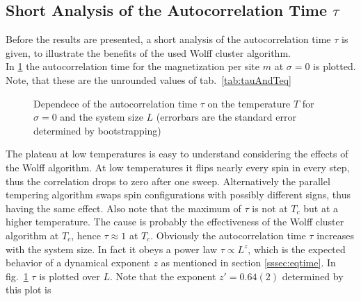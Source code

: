 \subsection{Short Analysis of the Autocorrelation Time  $\tau$}
\label{ssec:results:autocorr}
    Before the results are presented, a short analysis of the
    autocorrelation time \(\tau\) is given, to illustrate the benefits
    of the used Wolff cluster algorithm.\\
    In \ref{fig:autocorr}
    the autocorrelation time for the magnetization per site \(m\) at
    \(\sigma=0\) is plotted. Note, that these are the unrounded values
    of tab.\ \ref{tab:tauAndTeq}
    \begin{figure}[htbp]
        \centering
        \caption[The Autocorrelation Time $\tau$]
        {
            Dependece of the autocorrelation time $\tau$ on
             the temperature $T$ for
                $\sigma=0$ and
             the system size $L$ (errorbars
                are the standard error determined by bootstrapping)
        }
        \label{fig:autocorr}
    \end{figure}
    The plateau at low temperatures is easy to understand considering the
    effects of the Wolff algorithm. At low temperatures it flips nearly every
    spin in every step, thus the correlation drops to zero after one sweep.
    Alternatively the parallel tempering algorithm swaps spin configurations
    with possibly different signs, thus having the same effect.
    Also note that the maximum of \(\tau\) is not at \(T_c\) but at a higher
    temperature. The cause is probably the effectiveness of the Wolff cluster
    algorithm at \(T_c\), hence \(\tau \approx 1\) at \(T_{c}\).
    Obviously the autocorrelation time \(\tau\) increases with the system
    size. In fact it obeys a power law \(\tau \propto L^z\), which is
    the expected behavior of a dynamical exponent \(z\) as mentioned in
    section \ref{sssec:eqtime}.
    In fig.\ \ref{fig:autocorr} \(\tau\) is plotted
    over \(L\). Note that the exponent \(z'=0.64(2)\) determined by this plot is
